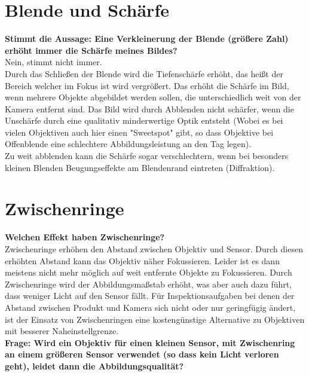\documentclass[a4paper]{article}
\begin{document}
	\section{Blende und Schärfe}
	\textbf{Stimmt die Aussage: Eine Verkleinerung der Blende (größere Zahl) erhöht immer die Schärfe meines Bildes?}\\
	Nein, stimmt nicht immer.\\
	Durch das Schließen der Blende wird die Tiefenschärfe erhöht, das heißt der Bereich welcher im Fokus ist wird vergrößert. Das erhöht die Schärfe im Bild, wenn mehrere Objekte abgebildet werden sollen, die unterschiedlich weit von der Kamera entfernt sind. Das Bild wird durch Abblenden nicht schärfer, wenn die Unschärfe durch eine qualitativ minderwertige Optik entsteht (Wobei es bei vielen Objektiven auch hier einen "Sweetspot" gibt, so dass Objektive bei Offenblende eine schlechtere Abbildungsleistung an den Tag legen).\\
	Zu weit abblenden kann die Schärfe sogar verschlechtern, wenn bei besonders kleinen Blenden Beugungseffekte am Blendenrand eintreten (Diffraktion).\\
	
	\newpage
	
	\section{Zwischenringe}
	\textbf{Welchen Effekt haben Zwischenringe?}\\
	Zwischenringe erhöhen den Abstand zwischen Objektiv und Sensor. Durch diesen erhöhten Abstand kann das Objektiv näher Fokussieren. Leider ist es dann meistens nicht mehr möglich auf weit entfernte Objekte zu Fokussieren. Durch Zwischenringe wird der Abbildungsmaßstab erhöht, was aber auch dazu führt, dass weniger Licht auf den Sensor fällt. Für Inspektionsaufgaben bei denen der Abstand zwischen Produkt und Kamera sich nicht oder nur geringfügig ändert, ist der Einsatz von Zwischenringen eine kostengünstige Alternative zu Objektiven mit besserer Naheinstellgrenze.\\
	\textbf{Frage: Wird ein Objektiv für einen kleinen Sensor, mit Zwischenring an einem größeren Sensor verwendet (so dass kein Licht verloren geht), leidet dann die Abbildungsqualität?}\\
	
\end{document}
